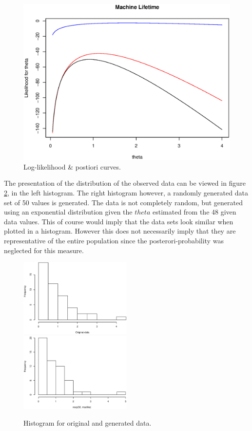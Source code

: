 \documentclass[a4paper, twocolumn]{article}
\begin{document}
	\begin{figure}[H]
		\centering
		\begin{minipage}[]{0.5\textwidth}
			\includegraphics[width=\textwidth]{share/loglike.eps}  
			\caption{Log-likelihood \& postiori curves.\label{fig:likelihood} }
		\end{minipage}
	\end{figure}
	
	 The presentation of the distribution of the observed data can be viewed in figure \ref{fig:hist}, in the left histogram. The right histogram however, a randomly generated data set of 50 values is generated. The data is not completely random, but generated using an exponential distribution given the \(theta\) estimated from the 48 given data values. This of course would imply that the data sets look similar when plotted in a histogram. However this does not necessarily imply that they are representative of the entire population since the posterori-probability was neglected for this measure. 

\begin{figure}[h]
	\includegraphics[width=0.5\textwidth]{share/hist_original.eps}
	\includegraphics[width=0.5\textwidth]{share/hist_rexp.eps}
	\caption{\label{fig:hist}Histogram for original and generated data.}
\end{figure}
\end{document}
